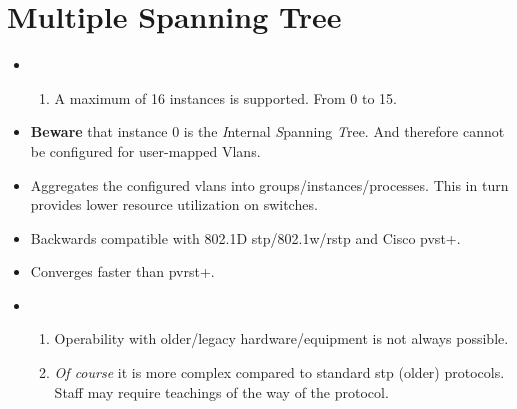 
\section{Multiple Spanning Tree}

\begin{itemize}
    \item {}
    \begin{enumerate}
        \item A maximum of 16 instances is supported. {\footnotesize From 0 to 15.}
    \end{enumerate}
    \item \textbf{Beware} that instance 0 is the \textit{I}nternal \textit{S}panning \textit{T}ree. And therefore cannot be configured for user-mapped Vlans.
    \item Aggregates the configured vlans into groups/instances/processes. This in turn provides lower resource utilization on switches. \dWinkey
    \item Backwards compatible with 802.1D \gls{stp}/802.1w/\gls{rstp} and Cisco \gls{pvst+}.
    \item Converges faster than \gls{pvrst+}.
    \item {}
    \begin{enumerate}
        \item Operability with older/legacy hardware/equipment is not always possible.
        \item \textit{Of course} it is more complex compared to standard \gls{stp} (older) protocols. {\footnotesize Staff may require teachings of the way of the protocol.}
    \end{enumerate}
\end{itemize}

\begin{table}[h]
    \centering
    \caption{MST Attributes}
    \label{mstattr}
\end{table}

